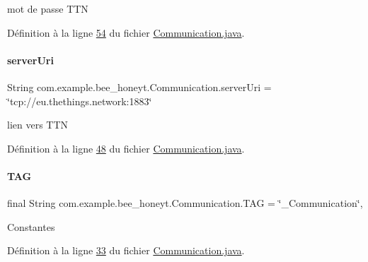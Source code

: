 mot de passe T\+TN 



Définition à la ligne \hyperlink{_communication_8java_source_l00054}{54} du fichier \hyperlink{_communication_8java_source}{Communication.\+java}.

\mbox{\label{classcom_1_1example_1_1bee__honeyt_1_1_communication_a19b957478f8d8a0d8319e8459d85862e}} 
\paragraph{\texorpdfstring{server\+Uri}{serverUri}}
{\footnotesize\ttfamily String com.\+example.\+bee\+\_\+honeyt.\+Communication.\+server\+Uri = \char`\"{}tcp\+://eu.\+thethings.\+network\+:1883\char`\"{}\hspace{0.3cm}{\ttfamily [private]}}



lien vers T\+TN 



Définition à la ligne \hyperlink{_communication_8java_source_l00048}{48} du fichier \hyperlink{_communication_8java_source}{Communication.\+java}.

\mbox{\label{classcom_1_1example_1_1bee__honeyt_1_1_communication_a848338dd9654af654c7e681742666785}} 
\paragraph{\texorpdfstring{T\+AG}{TAG}}
{\footnotesize\ttfamily final String com.\+example.\+bee\+\_\+honeyt.\+Communication.\+T\+AG = \char`\"{}\+\_\+\+Communication\char`\"{}\hspace{0.3cm}{\ttfamily [static]}, {\ttfamily [private]}}

Constantes 

Définition à la ligne \hyperlink{_communication_8java_source_l00033}{33} du fichier \hyperlink{_communication_8java_source}{Communication.\+java}.

